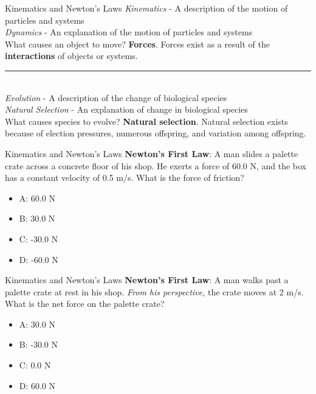 \documentclass{beamer}
\begin{document}
\begin{frame}{Kinematics and Newton's Laws}
\small
\textit{Kinematics} - A \alert{description} of the motion of particles and systems \\
\textit{Dynamics} - An \alert{explanation} of the motion of particles and systems \\
\vspace{0.25cm}
What causes an object to move?  \textbf{Forces}.  Forces exist as a result of the \alert{\textbf{interactions}} of objects or systems.\\
\vspace{0.25cm}
\rule{10cm}{0.4pt} \\
\vspace{0.25cm}
\textit{Evolution} - A \alert{description} of the change of biological species \\
\textit{Natural Selection} - An \alert{explanation} of change in biological species \\
\vspace{0.25cm}
What causes species to evolve?  \textbf{Natural selection}.  Natural selection exists because of \alert{election pressures}, \alert{numerous offspring}, and \alert{variation} among offspring.
\end{frame}

\begin{frame}{Kinematics and Newton's Laws}
\textbf{Newton's First Law}: A man slides a palette crate across a concrete floor of his shop.  He exerts a force of 60.0 N, and the box has a constant velocity of 0.5 m/s.  What is the force of friction?
\begin{itemize}
\item A: 60.0 N
\item B: 30.0 N
\item C: -30.0 N
\item D: -60.0 N
\end{itemize}
\end{frame}

\begin{frame}{Kinematics and Newton's Laws}
\textbf{Newton's First Law}: A man walks past a palette crate at rest in his shop.  \textit{From his perspective,} the crate moves at 2 m/s.  What is the net force on the palette crate?
\begin{itemize}
\item A: 30.0 N
\item B: -30.0 N
\item C: 0.0 N
\item D: 60.0 N
\end{itemize}
\end{frame}
\end{document}
